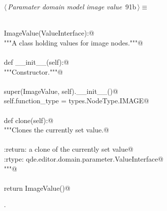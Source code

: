 \documentclass[
    a4paper,      %
    10pt,         %
    openright,    %
    notitlepage,  %
    parskip=half, %
]{scrreprt}       %
\theoremstyle{definition}                    %
\begin{document}
\begin{flushleft} \small
\begin{minipage}{\linewidth}\label{scrap149}\raggedright\small
{} $\langle\,${\itshape Paramater domain model image value}\nobreak\ {\footnotesize {91b}}$\,\rangle\equiv$
\vspace{-1exm}
\begin{list}{}{} \item
\mbox{}\lstinline@@\\
\mbox{}\lstinline@class ImageValue(ValueInterface):@\\
\mbox{}\lstinline@    """A class holding values for image nodes."""@\\
\mbox{}\lstinline@@\\
\mbox{}\lstinline@    def __init__(self):@\\
\mbox{}\lstinline@        """Constructor."""@\\
\mbox{}\lstinline@@\\
\mbox{}\lstinline@        super(ImageValue, self).__init__()@\\
\mbox{}\lstinline@        self.function_type = types.NodeType.IMAGE@\\
\mbox{}\lstinline@@\\
\mbox{}\lstinline@    def clone(self):@\\
\mbox{}\lstinline@        """Clones the currently set value.@\\
\mbox{}\lstinline@@\\
\mbox{}\lstinline@        :return: a clone of the currently set value@\\
\mbox{}\lstinline@        :rtype:  qde.editor.domain.parameter.ValueInterface@\\
\mbox{}\lstinline@        """@\\
\mbox{}\lstinline@@\\
\mbox{}\lstinline@        return ImageValue()@{\NWsep}
\end{list}
\vspace{-1.5ex}
\footnotesize
\begin{list}{}{\setlength{\itemsep}{-\parsep}\setlength{\itemindent}{-\leftmargin}}
\item {\NWtxtMacroNoRef}.

\item{}
\end{list}
\end{minipage}\vspace{4ex}
\end{flushleft}
\end{document}
